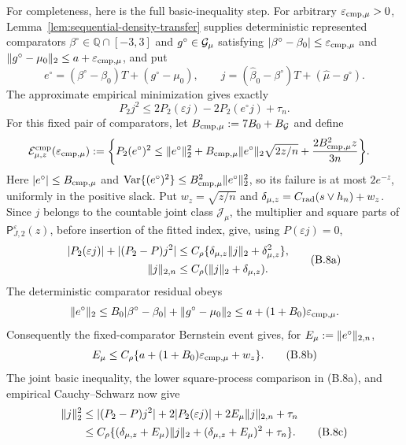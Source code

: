 For completeness, here is the full basic-inequality step.  For arbitrary
\(\varepsilon_{\rm cmp,\mu}>0\),
Lemma~\ref{lem:sequential-density-transfer} supplies deterministic represented
comparators \(\beta^\circ\in\mathbb Q\cap[-3,3]\) and
\(g^\circ\in\mathcal G_\mu\) satisfying
\(\lvert \beta^\circ-\beta_0\rvert\le\varepsilon_{\rm cmp,\mu}\) and
\(\lVert g^\circ-\mu_0\rVert_2\le a+\varepsilon_{\rm cmp,\mu}\), and put
\[
 e^\circ=(\beta^\circ-\beta_0)T+(g^\circ-\mu_0),\qquad
 j=(\widehat\beta_0-\beta^\circ)T+(\widehat\mu-g^\circ).
\]
The approximate empirical minimization gives exactly
\[
 P_2j^2\le2P_2(\varepsilon j)-2P_2(e^\circ j)+\tau_n.
\]
For this fixed pair of comparators, let
\(B_{\rm cmp,\mu}:=7B_0+B_{\mathcal G}\) and define
\[
\begin{split}
 \mathcal E_{\mu,z}^{\rm cmp}(\varepsilon_{\rm cmp,\mu})
 :=\bigg\{P_2(e^\circ)^2\le{}&\lVert e^\circ\rVert_2^2
 +B_{\rm cmp,\mu}\lVert e^\circ\rVert_2\sqrt{2z/n}
 +\frac{2B_{\rm cmp,\mu}^2z}{3n}\bigg\}.
\end{split}
\]
Here \(\lvert e^\circ\rvert\le B_{\rm cmp,\mu}\) and
\(\operatorname{Var}\{(e^\circ)^2\}\le
B_{\rm cmp,\mu}^2\lVert e^\circ\rVert_2^2\), so its failure is at most
\(2e^{-z}\), uniformly in the positive slack.
Put \(w_z=\sqrt{z/n}\) and
\(\delta_{\mu,z}=C_{\rm rad}(s\vee h_n)+w_z\).  Since \(j\) belongs to the
countable joint class \(\mathcal J_\mu\), the multiplier and square parts of
\(\mathsf P_{J,2}^{\varepsilon}(z)\), before insertion of the fitted index,
give, using \(P(\varepsilon j)=0\),
\begin{equation}
 \begin{split}
 |P_2(\varepsilon j)|+|(P_2-P)j^2|
 &\le C_\rho\{\delta_{\mu,z}\lVert j\rVert_2+\delta_{\mu,z}^2\},\\
 \lVert j\rVert_{2,n}&\le C_\rho(\lVert j\rVert_2+\delta_{\mu,z}).
 \end{split}
 \tag{B.8a}
\end{equation}
The deterministic comparator residual obeys
\[
 \lVert e^\circ\rVert_2
 \le B_0|\beta^\circ-\beta_0|+\lVert g^\circ-\mu_0\rVert_2
 \le a+(1+B_0)\varepsilon_{\rm cmp,\mu}.
\]
Consequently the fixed-comparator Bernstein event gives, for
\(E_\mu:=\lVert e^\circ\rVert_{2,n}\),
\begin{equation}
 E_\mu\le C_\rho\{a+(1+B_0)\varepsilon_{\rm cmp,\mu}+w_z\}.
 \tag{B.8b}
\end{equation}
The joint basic inequality, the lower square-process comparison in (B.8a),
and empirical Cauchy--Schwarz now give
\begin{align}
 \lVert j\rVert_2^2
 &\le |(P_2-P)j^2|+2|P_2(\varepsilon j)|
      +2E_\mu\lVert j\rVert_{2,n}+\tau_n \nonumber\\
 &\le C_\rho\{(\delta_{\mu,z}+E_\mu)\lVert j\rVert_2
              +(\delta_{\mu,z}+E_\mu)^2+\tau_n\}.
 \tag{B.8c}
\end{align}
